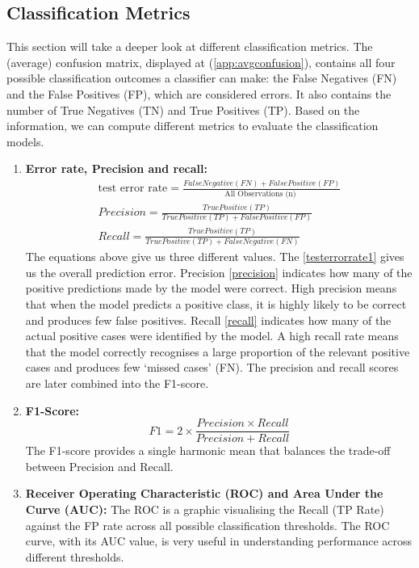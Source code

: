 \documentclass[12pt,a4paper,titlepage]{article}
\numberwithin{equation}{section}
\numberwithin{table}{section}
\numberwithin{figure}{section}
\begin{document}
    \subsection{Classification Metrics}\label{Classification metrics}
    This section will take a deeper look at different classification metrics. The (average) confusion matrix, displayed at (\ref{app:avgconfusion}), contains all four possible classification outcomes a classifier can make: the False Negatives (FN) and the False Positives (FP), which are considered errors. It also contains the number of True Negatives (TN) and True Positives (TP). Based on the information, we can compute different metrics to evaluate the classification models.
    \begin{enumerate}
        \item\label{it:errorrates} \textbf{Error rate, Precision and recall:}
        \begin{align}
        \text{test error rate} =  \frac{False Negative (FN) + False Positive(FP)}{\text{All Observations  (n) }}\label{testerrorrate1}\\
        Precision = \frac{True Positive (TP)}{True Positive (TP) + False Positive(FP)}\label{precision} \\
        Recall= \frac{True Positive (TP)}{True Positive (TP) + False Negative(FN)}\label{recall}
        \end{align}
        The equations above give us three different values. The \ref{testerrorrate1} gives us the overall prediction error. Precision \ref{precision} indicates how many of the positive predictions made by the model were correct. High precision means that when the model predicts a positive class, it is highly likely to be correct and produces few false positives. Recall \ref{recall} indicates how many of the actual positive cases were identified by the model. A high recall rate means that the model correctly recognises a large proportion of the relevant positive cases and produces few ‘missed cases’ (FN).
        The precision and recall scores are later combined into the F1-score.
        \item \textbf{F1-Score:}
        \begin{equation}
        F1 = 2 \times \frac{Precision\times Recall}{Precision + Recall}
        \end{equation}
        The F1-score provides a single harmonic mean that balances the trade-off between Precision and Recall.
        \item \textbf{Receiver Operating Characteristic (ROC) and Area Under the Curve (AUC):}
        The ROC is a graphic visualising the Recall (TP Rate) against the FP rate across all possible classification thresholds. The ROC curve, with its AUC value, is very useful in understanding performance across different thresholds.
        \end{enumerate}
    
\end{document}
